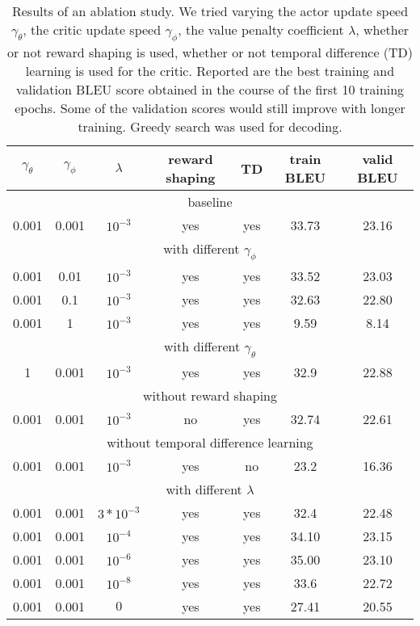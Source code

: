 \documentclass{article} \usepackage{iclr2017_conference,times}
\begin{document}
\begin{table}
    \caption{Results of an ablation study. We tried varying the actor update speed $\gamma_{\theta}$, 
             the critic update speed $\gamma_{\phi}$, the value penalty coefficient $\lambda$, 
             whether or not reward shaping is used, whether or not temporal difference (TD) learning is used
             for the critic. Reported are the best training and validation BLEU score obtained in the course
             of the first 10 training epochs. Some of the validation scores would still improve with longer training.
             Greedy search was used for decoding.}
    \centering
    \begin{tabular}{c  c  c  c  c  c c}
        $\gamma_{\theta}$ & $\gamma_{\phi}$ & $\lambda$ & reward shaping & TD & train BLEU & valid BLEU \\
        \hline
        \multicolumn{7}{c}{baseline} \\
0.001 & 0.001 & $10^{-3}$ & yes & yes & 33.73 & 23.16 \\
        \hline
        \multicolumn{7}{c}{with different $\gamma_{\phi}$} \\
0.001 & 0.01 & $10^{-3}$ & yes & yes & 33.52 & 23.03 \\
0.001 & 0.1 & $10^{-3}$ & yes & yes & 32.63 & 22.80 \\
0.001 & 1 & $10^{-3}$ & yes & yes & 9.59 & 8.14 \\
        \hline
        \multicolumn{7}{c}{with different $\gamma_{\theta}$} \\
1 & 0.001 & $10^{-3}$ & yes & yes & 32.9 & 22.88 \\
        \hline
        \multicolumn{7}{c}{without reward shaping} \\
0.001 & 0.001 & $10^{-3}$ & no & yes & 32.74 & 22.61 \\
        \hline
        \multicolumn{7}{c}{without temporal difference learning} \\
0.001 & 0.001 & $10^{-3}$ & yes & no & 23.2 & 16.36 \\
        \hline
        \multicolumn{7}{c}{with different $\lambda$} \\
0.001 & 0.001 & $3 * 10^{-3}$ & yes & yes & 32.4 & 22.48 \\
0.001 & 0.001 & $10^{-4}$ & yes & yes & 34.10 & 23.15 \\
0.001 & 0.001 & $10^{-6}$ & yes & yes & 35.00 & 23.10 \\
0.001 & 0.001 & $10^{-8}$ & yes & yes & 33.6 & 22.72 \\
0.001 & 0.001 & $0$ & yes & yes & 27.41 & 20.55 \\
    \end{tabular}
    \label{tab:ablation}
\end{table}
\end{document}
